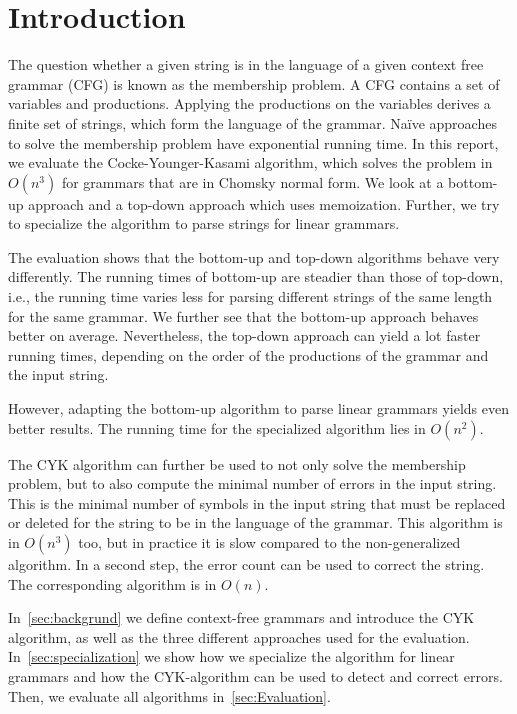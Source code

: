 \section{Introduction}

The question whether a given string is in the language of a given context free grammar (CFG) is known as the membership problem.
A CFG contains a set of variables and productions.
Applying the productions on the variables derives a finite set of strings, which form the language of the grammar.
Na\"{i}ve approaches to solve the membership problem have exponential running time.
In this report, we evaluate the Cocke-Younger-Kasami algorithm, which solves the problem in $O(n^3)$ for grammars that are in Chomsky normal form.
We look at a bottom-up approach and a top-down approach which uses memoization.
Further, we try to specialize the algorithm to parse strings for linear grammars.

The evaluation shows that the bottom-up and top-down algorithms behave very differently.
The running times of bottom-up are steadier than those of top-down, i.e., the running time varies less for parsing different strings of the same length for the same grammar.
We further see that the bottom-up approach behaves better on average.
Nevertheless, the top-down approach can yield a lot faster running times, depending on the order of the productions of the grammar and the input string.

However, adapting the bottom-up algorithm to parse linear grammars yields even better results.
The running time for the specialized algorithm lies in $O(n^2)$.

The CYK algorithm can further be used to not only solve the membership problem, but to also compute the minimal number of errors in the input string.
This is the minimal number of symbols in the input string that must be replaced or deleted for the string to be in the language of the grammar.
This algorithm is in $O(n^3)$ too, but in practice it is slow compared to the non-generalized algorithm.
In a second step, the error count can be used to correct the string. The corresponding algorithm is in $O(n)$.

In~\cref{sec:backgrund} we define context-free grammars and introduce the CYK algorithm, as well as the three different approaches used for the evaluation.
In~\cref{sec:specialization} we show how we specialize the algorithm for linear grammars and how the CYK-algorithm can be used to detect and correct errors.
Then, we evaluate all algorithms in~\cref{sec:Evaluation}.


